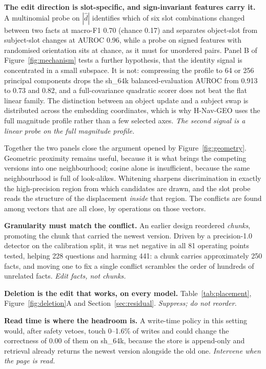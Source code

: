 \documentclass[journal=jcisd8,manuscript=article]{achemso}
\begin{document}
\textbf{The edit direction is slot-specific, and sign-invariant features carry it.} A multinomial probe on $|\hat d|$ identifies which of six slot combinations changed between two facts at macro-F1 0.70 (chance 0.17) and separates object-slot from subject-slot changes at AUROC 0.96, while a probe on signed features with randomised orientation sits at chance, as it must for unordered pairs. Panel B of Figure~\ref{fig:mechanism} tests a further hypothesis, that the identity signal is concentrated in a small subspace. It is not: compressing the profile to 64 or 256 principal components drops the sh\_64k balanced-evaluation AUROC from 0.913 to 0.73 and 0.82, and a full-covariance quadratic scorer does not beat the flat linear family. The distinction between an object update and a subject swap is distributed across the embedding coordinates, which is why H-Nav-GEO uses the full magnitude profile rather than a few selected axes. \emph{The second signal is a linear probe on the full magnitude profile.}

Together the two panels close the argument opened by Figure~\ref{fig:geometry}. Geometric proximity remains useful, because it is what brings the competing versions into one neighbourhood; cosine alone is insufficient, because the same neighbourhood is full of look-alikes. Whitening sharpens discrimination in exactly the high-precision region from which candidates are drawn, and the slot probe reads the structure of the displacement \emph{inside} that region. The conflicts are found among vectors that are all close, by operations on those vectors.

\textbf{Granularity must match the conflict.} An earlier design reordered \emph{chunks}, promoting the chunk that carried the newest version. Driven by a precision-1.0 detector on the calibration split, it was net negative in all 81 operating points tested, helping 228 questions and harming 441: a chunk carries approximately 250 facts, and moving one to fix a single conflict scrambles the order of hundreds of unrelated facts. \emph{Edit facts, not chunks.}

\textbf{Deletion is the edit that works, on every model.} Table~\ref{tab:placement}, Figure~\ref{fig:deletion}A and Section~\ref{sec:residual}. \emph{Suppress; do not reorder.}

\textbf{Read time is where the headroom is.} A write-time policy in this setting would, after safety vetoes, touch 0--1.6\% of writes and could change the correctness of 0.00 of them on sh\_64k, because the store is append-only and retrieval already returns the newest version alongside the old one. \emph{Intervene when the page is read.}
\end{document}
